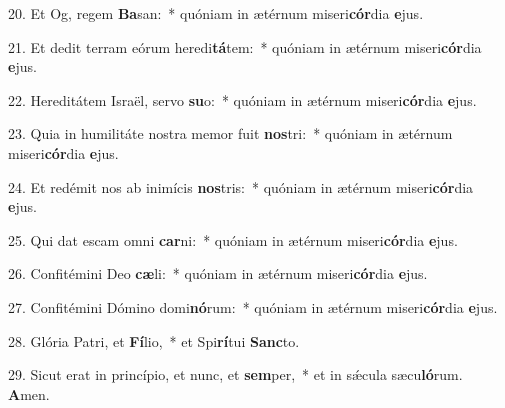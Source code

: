 20. Et Og, regem \textbf{Ba}san:~*  quóniam in ætérnum miseri\textbf{cór}dia \textbf{e}jus.\

21. Et dedit terram eórum heredi\textbf{tá}tem:~*  quóniam in ætérnum miseri\textbf{cór}dia \textbf{e}jus.\

22. Hereditátem Israël, servo \textbf{su}o:~*  quóniam in ætérnum miseri\textbf{cór}dia \textbf{e}jus.\

23. Quia in humilitáte nostra memor fuit \textbf{nos}tri:~*  quóniam in ætérnum miseri\textbf{cór}dia \textbf{e}jus.\

24. Et redémit nos ab inimícis \textbf{nos}tris:~*  quóniam in ætérnum miseri\textbf{cór}dia \textbf{e}jus.\

25. Qui dat escam omni \textbf{car}ni:~*  quóniam in ætérnum miseri\textbf{cór}dia \textbf{e}jus.\

26. Confitémini Deo \textbf{cæ}li:~*  quóniam in ætérnum miseri\textbf{cór}dia \textbf{e}jus.\

27. Confitémini Dómino domi\textbf{nó}rum:~*  quóniam in ætérnum miseri\textbf{cór}dia \textbf{e}jus.\

28. Glória Patri, et \textbf{Fí}lio,~*  et Spi\textbf{rí}tui \textbf{Sanc}to.\

29. Sicut erat in princípio, et nunc, et \textbf{sem}per,~*  et in sǽcula sæcu\textbf{ló}rum. \textbf{A}men.\

